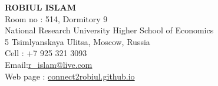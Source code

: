 \documentclass[letterpaper,10pt]{article}
\begin{document}
\textbf{ROBIUL ISLAM }  \\
Room no : 514, Dormitory 9  \\
National Research University Higher School of Economics  \\
5 Tsimlyanskaya Ulitsa, Moscow, Russia  \\
Cell : +7 925 321 3093 \\
Email:\href{mailto:r\_islam@live.com}{r\_islam@live.com} \\
Web page : \url{connect2robiul.github.io}



\vspace{0.1in}
\end{document}
